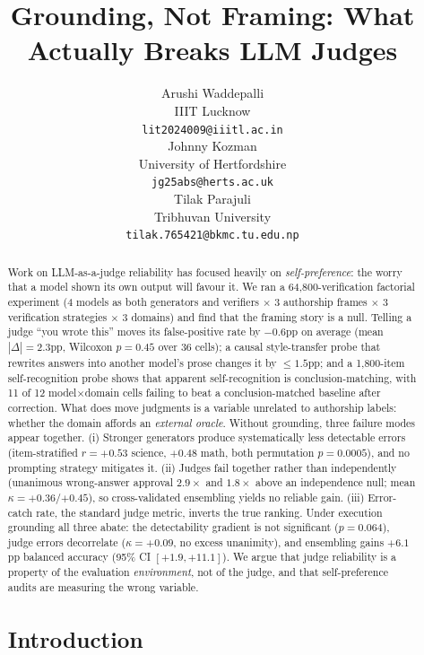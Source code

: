 \documentclass{article}
\title{Grounding, Not Framing: What Actually Breaks LLM Judges}
\author{
  Arushi Waddepalli \\
  IIIT Lucknow \\
  \texttt{lit2024009@iiitl.ac.in} \\
  \And
  Johnny Kozman \\
  University of Hertfordshire \\
  \texttt{jg25abs@herts.ac.uk} \\
  \And
  Tilak Parajuli \\
  Tribhuvan University \\
  \texttt{tilak.765421@bkmc.tu.edu.np} \\
}
\begin{document}
\maketitle


\begin{abstract}
Work on LLM-as-a-judge reliability has focused heavily on \emph{self-preference}: the worry
that a model shown its own output will favour it. We ran a 64,800-verification factorial
experiment (4 models as both generators and verifiers $\times$ 3 authorship frames $\times$ 3
verification strategies $\times$ 3 domains) and find that the framing story is a null. Telling
a judge ``you wrote this'' moves its false-positive rate by $-0.6$pp on average
(mean $|\Delta| = 2.3$pp, Wilcoxon $p = 0.45$ over 36 cells); a causal style-transfer probe
that rewrites answers into another model's prose changes it by $\le 1.5$pp; and a
1,800-item self-recognition probe shows that apparent self-recognition is conclusion-matching,
with 11 of 12 model$\times$domain cells failing to beat a conclusion-matched baseline after
correction. What does move judgments is a variable unrelated to authorship labels: whether the
domain affords an \emph{external oracle}. Without grounding, three failure modes appear
together. (i) Stronger generators produce systematically less detectable errors
(item-stratified $r = {+}0.53$ science, ${+}0.48$ math, both permutation $p = 0.0005$), and no
prompting strategy mitigates it. (ii) Judges fail together rather than independently
(unanimous wrong-answer approval $2.9\times$ and $1.8\times$ above an independence null;
mean $\kappa = {+}0.36$/${+}0.45$), so cross-validated ensembling yields no reliable gain.
(iii) Error-catch rate, the standard judge metric, inverts the true ranking. Under execution
grounding all three abate: the detectability gradient is not significant ($p = 0.064$), judge
errors decorrelate ($\kappa = {+}0.09$, no excess unanimity), and ensembling gains
${+}6.1$pp balanced accuracy (95\% CI $[{+}1.9, {+}11.1]$). We argue that judge reliability
is a property of the evaluation \emph{environment}, not of the judge, and that
self-preference audits are measuring the wrong variable.

\section{Introduction}
\label{Introduction}


\end{abstract}
\end{document}
